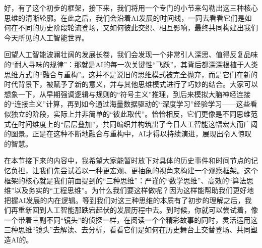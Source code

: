 好，有了这个初步的框架，接下来，我们将用一个专门的小节来勾勒出这三种核心思维的清晰轮廓。在此之后，我们会沿着AI发展的时间线，一同去看看它们是如何在不同的历史阶段轮流登场，又如何彼此交织、相互影响，最终共同构建出我们今天所见的人工智能世界。



回望人工智能波澜壮阔的发展长卷，我们会发现一个非常引人深思、值得反复品味的“耐人寻味的规律”：那就是AI的每一次关键性“飞跃”，其背后都深深根植于人类思维方式的“融合与重构”。这并不是说旧的思维模式被完全抛弃，而是它们在新的时代背景下，被赋予了新的意义，并与其他思维模式进行了巧妙的结合。大家可以想象一下，从早期强调逻辑与规则的“符号主义”推理，到后来模拟大脑神经连接的“连接主义”计算，再到如今通过海量数据驱动的“深度学习”经验学习——这些看似独立的阶段，实际上并非简单的“彼此取代”。恰恰相反，它们更像是不同思维范式在时间维度上的“层层叠加”，共同编织并构筑出了今日人工智能这幅宏大而广阔的图景。正是在这种不断地融合与重构中，AI才得以持续演进，展现出令人惊叹的智慧。



在本节接下来的内容中，我希望大家能暂时放下对具体的历史事件和时间节点的记忆负担，让我们先尝试着以一种更宏观、更抽象的视角来构建一个观察框架。这个框架的核心就是我们前面提到的“三种思维”：严谨的“数学思维”、高效的“算法思维”以及务实的“工程思维”。为什么我们要这样做呢？因为这样能帮助我们更好地把握AI发展的内在逻辑。等到我们对这三种思维的本质有了初步的理解之后，我们再重新回到人工智能那跌宕起伏的发展历程中去。到时候，你就可以尝试着，像一个带着三副不同“镜头”的侦探一样，在阅读一个个精彩故事的同时，灵活运用这三种思维“镜头”去解读、去分析，看看它们是如何在历史舞台上交替登场、共同塑造AI的。

